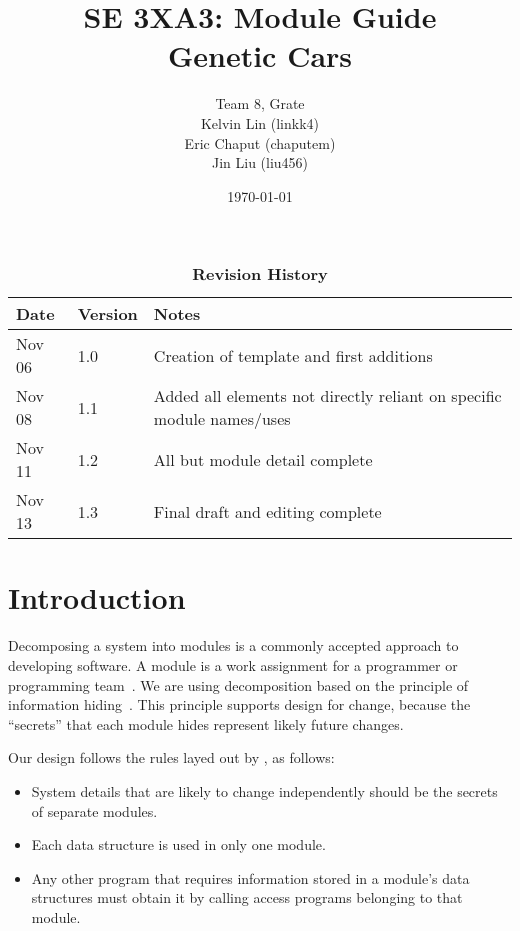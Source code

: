 \documentclass[12pt, titlepage]{article}
\title{SE 3XA3: Module Guide\\Genetic Cars}
\author{Team 8, Grate
		\\ Kelvin Lin (linkk4)
		\\ Eric Chaput (chaputem)
		\\ Jin Liu (liu456)
}
\date{\today}
\begin{document}
\maketitle

\tableofcontents
\listoftables
\listoffigures

\begin{table}[bp]
\caption{\bf Revision History}
\begin{tabularx}{\textwidth}{p{3cm}p{2cm}X}
\toprule {\bf Date} & {\bf Version} & {\bf Notes}\\
\midrule
Nov 06 & 1.0 & Creation of template and first additions\\
Nov 08 & 1.1 & Added all elements not directly reliant on specific module names/uses\\
Nov 11 & 1.2 & All but module detail complete\\
Nov 13 & 1.3 & Final draft and editing complete\\
\bottomrule
\end{tabularx}
\end{table}

\newpage


\section{Introduction}

Decomposing a system into modules is a commonly accepted approach to developing
software.  A module is a work assignment for a programmer or programming
team~\citep{ParnasEtAl1984}.  We are using decomposition
based on the principle of information hiding~\citep{Parnas1972a}.  This
principle supports design for change, because the ``secrets'' that each module
hides represent likely future changes.  

Our design follows the rules layed out by \citet{ParnasEtAl1984}, as follows:
\begin{itemize}
\item System details that are likely to change independently should be the
  secrets of separate modules.
\item Each data structure is used in only one module.
\item Any other program that requires information stored in a module's data
  structures must obtain it by calling access programs belonging to that module.
\end{itemize}
\end{document}
